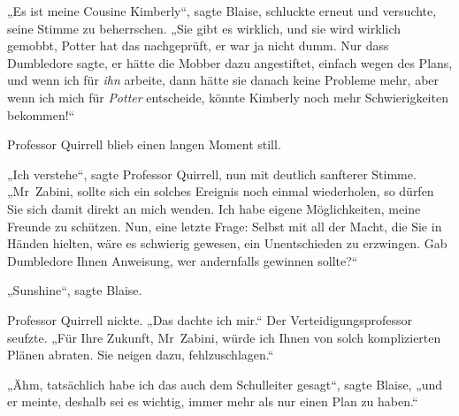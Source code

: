 „Es ist meine Cousine Kimberly“, sagte Blaise, schluckte erneut und versuchte, seine Stimme zu beherrschen.
„Sie gibt es wirklich, und sie wird wirklich gemobbt, Potter hat das nachgeprüft, er war ja nicht dumm. Nur dass Dumbledore sagte, er hätte die Mobber dazu angestiftet, einfach wegen des Plans, und wenn ich für \emph{ihn} arbeite, dann hätte sie danach keine Probleme mehr, aber wenn ich mich für \emph{Potter} entscheide, könnte Kimberly noch mehr Schwierigkeiten bekommen!“

Professor Quirrell blieb einen langen Moment still.

„Ich verstehe“, sagte Professor Quirrell, nun mit deutlich sanfterer Stimme.
„Mr~Zabini, sollte sich ein solches Ereignis noch einmal wiederholen, so dürfen Sie sich damit direkt an mich wenden. Ich habe eigene Möglichkeiten, meine Freunde zu schützen. Nun, eine letzte Frage: Selbst mit all der Macht, die Sie in Händen hielten, wäre es schwierig gewesen, ein Unentschieden zu erzwingen. Gab Dumbledore Ihnen Anweisung, wer andernfalls gewinnen sollte?“

„Sunshine“, sagte Blaise.

Professor Quirrell nickte.
„Das dachte ich mir.“ Der Verteidigungsprofessor seufzte.
„Für Ihre Zukunft, Mr~Zabini, würde ich Ihnen von solch komplizierten Plänen abraten. Sie neigen dazu, fehlzuschlagen.“

„Ähm, tatsächlich habe ich das auch dem Schulleiter gesagt“, sagte Blaise, „und er meinte, deshalb sei es wichtig, immer mehr als nur einen Plan zu haben.“

